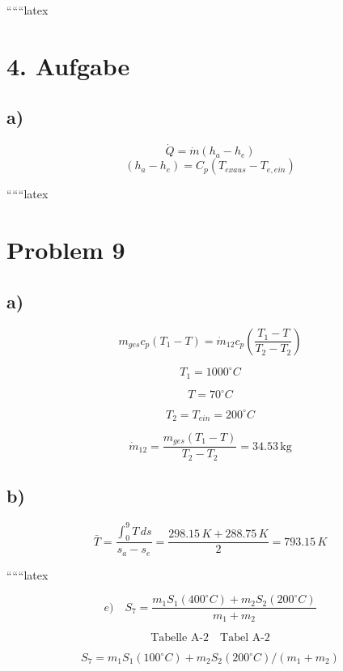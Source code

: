 
``````latex


\section*{4. Aufgabe}

\subsection*{a)}
\[
\dot{Q} = \dot{m} (h_a - h_e)
\]
\[
(h_a - h_e) = C_p (T_{exaus} - T_{e,ein})
\]

``````latex


\section*{Problem 9}

\subsection*{a)}

\[
m_{ges} c_p (T_1 - T) = \dot{m}_{12} c_p \left( \frac{T_1 - T}{T_2 - T_2} \right)
\]

\[
T_1 = 1000^\circ C
\]

\[
T = 70^\circ C
\]

\[
T_2 = T_{ein} = 200^\circ C
\]

\[
\dot{m}_{12} = \frac{m_{ges} (T_1 - T)}{T_2 - T_2} = 34.53 \, \text{kg}
\]

\subsection*{b)}

\[
\bar{T} = \frac{\int_{0}^{9} T \, ds}{s_a - s_e} = \frac{298.15 \, K + 288.75 \, K}{2} = 793.15 \, K
\]

``````latex


\begin{equation*}
e) \quad S_{7} = \frac{m_{1}S_{1}(400^{\circ}C) + m_{2}S_{2}(200^{\circ}C)}{m_{1} + m_{2}}
\end{equation*}

\begin{equation*}
\text{Tabelle A-2} \quad \text{Tabel A-2}
\end{equation*}

\begin{equation*}
S_{7} = m_{1} S_{1}(100^{\circ}C) + m_{2} S_{2}(200^{\circ}C) / (m_{1} + m_{2})
\end{equation*}

